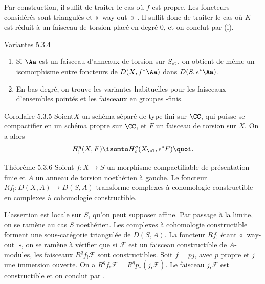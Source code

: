 Par construction, il suffit de traiter le cas où $f$ est propre. Les
foncteurs considérés sont triangulés et « way-out » \cite[I 7]{RD}. Il
suffit donc de traiter le cas où $K$ est réduit à un faisceau de
torsion placé en degré $0$, et on conclut par  (i).

\begin{enonce*}[remark]{Variantes 5.3.4}
\begin{enumerate}
\renewcommand{\theenumi}{\roman{enumi}}
\renewcommand{\labelenumi}{(\theenumi)}
\item Si $\Aa$ est un faisceau d'anneaux de torsion sur
$S_{\text{\rm et}}$, on obtient de même un isomorphisme 
entre foncteurs de $D(X,f^{\ast}\Aa)$ dans $D(S,\epsilon^{\ast}\Aa)$.

\item En bas degré, on trouve les variantes habituelles pour les
faisceaux d'ensembles pointés et les faisceaux en groupes \iInd-finis.
\end{enumerate}
\end{enonce*}

\begin{enonce*}{Corollaire 5.3.5}
Soient\pageoriginale $X$ un schéma séparé de type fini sur
$\CC$, qui puisse se compactifier en un schéma propre sur
$\CC$, et $F$ un faisceau de torsion sur $X$. On a alors
$$
H^{q}_{!}(X,F)\isomto
H^{q}_c(X_{\cl},\epsilon^{\ast}F){\quoi}.
$$
\end{enonce*}

\begin{enonce*}{Théorème 5.3.6}
Soient $f:X\rightarrow S$ un morphisme compactifiable de présentation
finie et $A$ un anneau de torsion noethérien à gauche. Le foncteur
$Rf_{!}:D(X,A)\rightarrow D(S,A)$ transforme complexes à cohomologie
constructible en complexes à cohomologie constructible.
\end{enonce*}

L'assertion est locale sur $S$, qu'on peut supposer affine. Par
passage à la limite, on se ramène au cas $S$ noethérien. Les complexes
à cohomologie constructible forment une sous-catégorie triangulée de
$D(S,A)$. La foncteur $Rf_{!}$ étant « way-out », on se ramène à
vérifier que si $\mathcal{F}$ est un faisceau constructible de
$A$-modules, les faisceaux $R^{q}f_{!}\mathcal{F}$ sont
constructibles. Soit $f=pj$, avec $p$ propre et $j$ une immersion
ouverte. On a
$R^{q}f_{!}\mathcal{F}=R^{q}p_{\ast}(j_{!}\mathcal{F})$. Le faisceau
$j_{!}\mathcal{F}$ est constructible et on conclut par .

